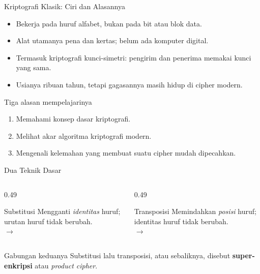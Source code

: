 \documentclass[aspectratio=169,11pt]{beamer}
\begin{document}
\begin{frame}{Kriptografi Klasik: Ciri dan Alasannya}
    \begin{itemize}
        \item Bekerja pada huruf alfabet, bukan pada bit atau blok data.
        \item Alat utamanya pena dan kertas; belum ada komputer digital.
        \item Termasuk kriptografi kunci-simetri: pengirim dan penerima
              memakai kunci yang sama.
        \item Usianya ribuan tahun, tetapi gagasannya masih hidup di cipher
              modern.
    \end{itemize}
    \vspace{0.15cm}
    \begin{block}{Tiga alasan mempelajarinya}
        \begin{enumerate}
            \item Memahami konsep dasar kriptografi.
            \item Melihat akar algoritma kriptografi modern.
            \item Mengenali kelemahan yang membuat suatu cipher mudah
                  dipecahkan.
        \end{enumerate}
    \end{block}
\end{frame}

\begin{frame}{Dua Teknik Dasar}
    \begin{columns}[T,onlytextwidth]
        \begin{column}{0.49\textwidth}
            \begin{block}{Substitusi}
                \footnotesize
                Mengganti \emph{identitas} huruf; urutan huruf tidak
                berubah.\\[3pt]
                 $\longrightarrow$ 
            \end{block}
        \end{column}
        \begin{column}{0.49\textwidth}
            \begin{exampleblock}{Transposisi}
                \footnotesize
                Memindahkan \emph{posisi} huruf; identitas huruf tidak
                berubah.\\[3pt]
                 $\longrightarrow$ 
            \end{exampleblock}
        \end{column}
    \end{columns}
    \vspace{0.3cm}
    \begin{alertblock}{Gabungan keduanya}
        Substitusi lalu transposisi, atau sebaliknya, disebut
        \textbf{super-enkripsi} atau \textit{product cipher}.
    \end{alertblock}
\end{frame}
\end{document}
